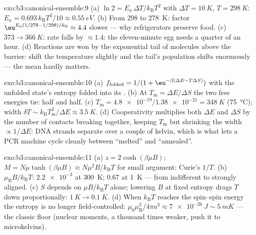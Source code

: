 \begin{solution}{exo:b3:canonical-ensemble:9}
(a) $\ln2 = E_a\,\Delta T/k_{\text{B}}T^2$ with $\Delta T =
\qty{10}{K}$, $T = \qty{298}{K}$: $E_a =
0.693\,k_{\text{B}}T^2/10 \approx \qty{0.55}{eV}$. (b) From
$298$ to \qty{278}{K}: factor $\eu^{E_a(1/278 - 1/298)/k_{\text{B}}}
\approx 4.4$ slower --- why refrigerators preserve food. (c)
$373 \to \qty{366}{K}$: rate falls by $\approx1.4$: the
eleven-minute egg needs a quarter of an hour. (d) Reactions are
won by the exponential tail of molecules above the barrier: shift
the temperature slightly and the tail's population shifts
enormously --- the mean hardly matters.
\end{solution}

\begin{solution}{exo:b3:canonical-ensemble:10}
(a) $f_{\text{folded}} = 1/(1 + \eu^{-\beta(\Delta E -
T\Delta S)})$ with the unfolded state's entropy folded into its
. (b) At $T_{\text{m}} = \Delta E/\Delta S$ the two
free energies tie: half and half. (c) $T_{\text{m}} =
\num{4.8e-19}/\num{1.38e-21} = \qty{348}{K}$ (\qty{75}{\celsius});
width $\delta T \sim k_{\text{B}}T_{\text{m}}^2/\Delta E \approx
\qty{3.5}{K}$. (d) Cooperativity multiplies both $\Delta E$ and
$\Delta S$ by the number of contacts breaking together, keeping
$T_{\text{m}}$ but shrinking the width $\propto 1/\Delta E$: DNA
strands separate over a couple of kelvin, which is what lets a
PCR machine cycle cleanly between ``melted'' and ``annealed''.
\end{solution}

\begin{solution}{exo:b3:canonical-ensemble:11}
(a) $z = 2\cosh(\beta\mu B)$; $M = N\mu\tanh(\beta\mu B) \approx
N\mu^2B/k_{\text{B}}T$ for small argument: Curie's $1/T$. (b)
$\mu_{\text{B}}B/k_{\text{B}}T$: $\num{2.2e-3}$ at \qty{300}{K};
$0.67$ at \qty{1}{K} --- from indifferent to strongly aligned. (c)
$S$ depends on $\mu B/k_{\text{B}}T$ alone; lowering $B$ at fixed
entropy drags $T$ down proportionally: $\qty{1}{K} \to
\qty{0.1}{K}$. (d) When $k_{\text{B}}T$ reaches the spin--spin
energy the entropy is no longer field-controlled:
$\mu_0\mu_{\text{B}}^2/4\pi a^3 \approx \qty{7e-26}{J} \sim
\qty{5}{mK}$ --- the classic floor (nuclear moments, a thousand
times weaker, push it to microkelvins).
\end{solution}

